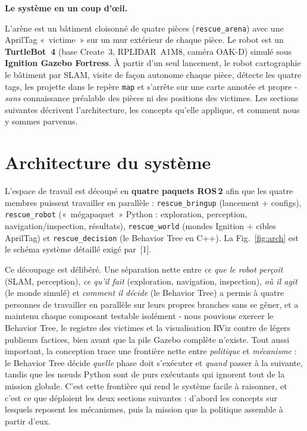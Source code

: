 \documentclass[11pt,a4paper]{article}
\newcommand{\head}[1]{\par\smallskip\noindent\textbf{\color{nccblue}#1}\par}
\begin{document}
\head{Le système en un coup d'œil.} L'arène est un bâtiment cloisonné de quatre pièces
(\texttt{rescue\_arena}) avec une AprilTag «~victime~» sur un mur extérieur de chaque pièce. Le robot
est un \textbf{TurtleBot~4} (base Create~3, RPLIDAR~A1M8, caméra OAK-D) simulé sous \textbf{Ignition
Gazebo Fortress}. À partir d'un seul lancement, le robot cartographie le bâtiment par SLAM, visite de
façon autonome chaque pièce, détecte les quatre tags, les projette dans le repère \texttt{map} et
s'arrête sur une carte annotée et propre - \emph{sans} connaissance préalable des pièces ni des
positions des victimes. Les sections suivantes décrivent l'architecture, les concepts qu'elle
applique, et comment nous y sommes parvenus.

\section{Architecture du système}
L'espace de travail est découpé en \textbf{quatre paquets ROS\,2} afin que les quatre membres puissent
travailler en parallèle : \texttt{rescue\_bringup} (lancement + configs), \texttt{rescue\_robot}
(«~mégapaquet~» Python : exploration, perception, navigation/inspection, résultats), \texttt{rescue\_world}
(mondes Ignition + cibles AprilTag) et \texttt{rescue\_decision} (le Behavior Tree en C++). La
Fig.~\ref{fig:arch} est le schéma système détaillé exigé par~[1].

Ce découpage est délibéré. Une séparation nette entre \emph{ce que le robot perçoit} (SLAM, perception),
\emph{ce qu'il fait} (exploration, navigation, inspection), \emph{où il agit} (le monde simulé) et
\emph{comment il décide} (le Behavior Tree) a permis à quatre personnes de travailler en parallèle sur
leurs propres branches sans se gêner, et a maintenu chaque composant testable isolément - nous pouvions
exercer le Behavior Tree, le registre des victimes et la visualisation RViz contre de légers publieurs
factices, bien avant que la pile Gazebo complète n'existe. Tout aussi important, la conception trace une
frontière nette entre \emph{politique} et \emph{mécanisme} : le Behavior Tree décide \emph{quelle} phase
doit s'exécuter et \emph{quand} passer à la suivante, tandis que les nœuds Python sont de purs
exécutants qui ignorent tout de la mission globale. C'est cette frontière qui rend le système facile à
raisonner, et c'est ce que déploient les deux sections suivantes : d'abord les concepts sur
lesquels reposent les mécanismes, puis la mission que la politique assemble à partir d'eux.
\end{document}
